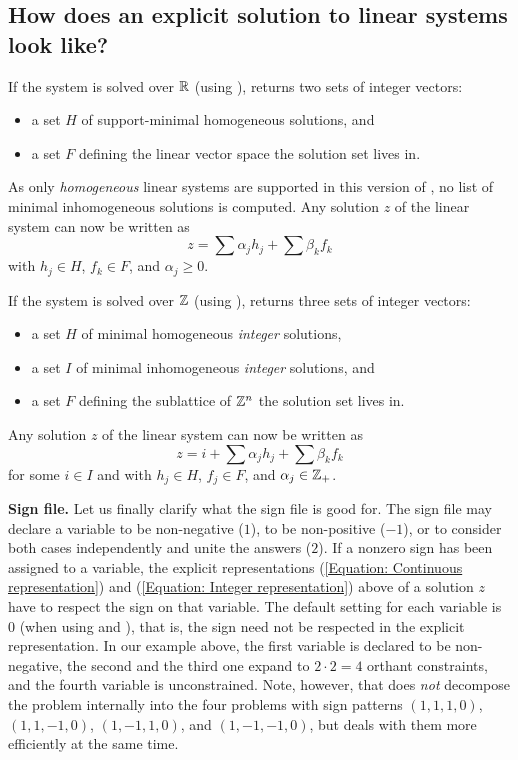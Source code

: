 \subsection{How does an explicit solution to linear systems look like?}

If the system is solved over $\mathbb R$ (using ),
\FourTiTwo{} returns two sets of integer vectors:
\begin{itemize}
\item a set $H$ of support-minimal homogeneous solutions, and
\item a set $F$ defining the linear vector space the solution set
lives in.
\end{itemize}
As only \emph{homogeneous} linear systems are supported in this
version of \FourTiTwo, no list of minimal inhomogeneous solutions is
computed. Any solution $z$ of the linear system can now be written
as
\begin{equation}\label{Equation: Continuous representation}
z=\sum \alpha_j h_j+ \sum \beta_k f_k
\end{equation}
with $h_j\in H$, $f_k\in F$, and $\alpha_j\geq 0$.

If the system is solved over $\mathbb Z$ (using ),
\FourTiTwo{} returns three sets of integer vectors:
\begin{itemize}
\item a set $H$ of minimal homogeneous \emph{integer} solutions,
\item a set $I$ of minimal inhomogeneous \emph{integer}
solutions, and
\item a set $F$ defining the sublattice of $\mathbb Z^n$ the solution set
lives in.
\end{itemize}
Any solution $z$ of the linear system can now be written as
\begin{equation}\label{Equation: Integer representation}
z=i+ \sum \alpha_j h_j+\sum \beta_k f_k
\end{equation}
for some $i\in I$ and with $h_j\in H$, $f_j\in F$, and
$\alpha_j\in\mathbb Z_+$.

{\bf Sign file.} Let us finally clarify what the sign file
 is good for. The sign file may declare a
variable to be non-negative ($1$), to be non-positive ($-1$), or to
consider both cases independently and unite the answers ($2$). If a
nonzero sign has been assigned to a variable, the explicit
representations (\ref{Equation: Continuous representation}) and
(\ref{Equation: Integer representation}) above of a solution $z$
have to respect the sign on that variable. The default setting for
each variable is $0$ (when using  and ),
that is, the sign need not be respected in the explicit
representation. In our example above, the first variable is declared
to be non-negative, the second and the third one expand to $2\cdot
2=4$ orthant constraints, and the fourth variable is unconstrained.
Note, however, that \FourTiTwo{} does \emph{not} decompose the
problem internally into the four problems with sign patterns
$(1,1,1,0)$, $(1,1,-1,0)$, $(1,-1,1,0)$, and $(1,-1,-1,0)$, but
deals with them more efficiently at the same time.


